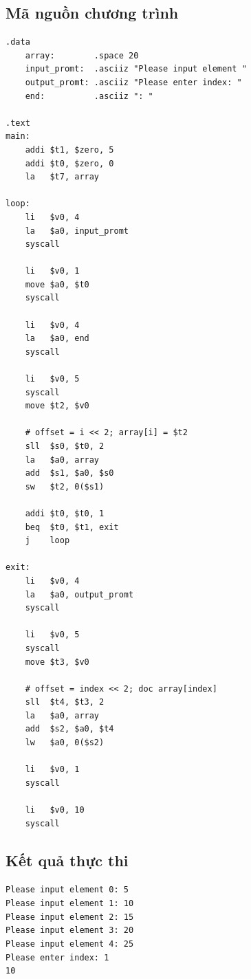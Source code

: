 \documentclass[a4paper]{article}
\numberwithin{figure}{section}
\numberwithin{table}{section}
\begin{document}
\subsection{Mã nguồn chương trình}
\begin{lstlisting}[style=mipsstyle]
.data
    array:        .space 20
    input_promt:  .asciiz "Please input element "
    output_promt: .asciiz "Please enter index: "
    end:          .asciiz ": "
    
.text
main:
    addi $t1, $zero, 5
    addi $t0, $zero, 0
    la   $t7, array

loop:
    li   $v0, 4
    la   $a0, input_promt
    syscall
    
    li   $v0, 1
    move $a0, $t0
    syscall
    
    li   $v0, 4
    la   $a0, end
    syscall
    
    li   $v0, 5
    syscall
    move $t2, $v0
    
    # offset = i << 2; array[i] = $t2
    sll  $s0, $t0, 2
    la   $a0, array
    add  $s1, $a0, $s0
    sw   $t2, 0($s1)
    
    addi $t0, $t0, 1
    beq  $t0, $t1, exit
    j    loop
    
exit:
    li   $v0, 4
    la   $a0, output_promt
    syscall
    
    li   $v0, 5
    syscall
    move $t3, $v0 
    
    # offset = index << 2; doc array[index]
    sll  $t4, $t3, 2
    la   $a0, array
    add  $s2, $a0, $t4
    lw   $a0, 0($s2)
    
    li   $v0, 1
    syscall
    
    li   $v0, 10
    syscall
\end{lstlisting}

\subsection{Kết quả thực thi}
\begin{outputbox}
\texttt{Please input element 0: 5}\\
\texttt{Please input element 1: 10}\\
\texttt{Please input element 2: 15}\\
\texttt{Please input element 3: 20}\\
\texttt{Please input element 4: 25}\\
\texttt{Please enter index: 1}\\
\texttt{10}
\end{outputbox}
\end{document}
